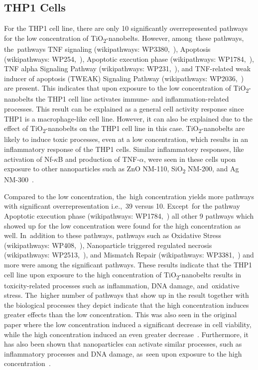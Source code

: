 \documentclass[ijms,article,accept,moreauthors,pdftex]{Definitions/mdpi}
\begin{document}
\begin{paracol}{2}
\subsection{THP1 Cells}
For the THP1 cell line, there are only 10 significantly overrepresented pathways for the low concentration of TiO\textsubscript{2}-nanobelts. However, among~these pathways, the~pathways TNF signaling (wikipathways: WP3380,~\cite{WP3380}), Apoptosis (wikipathways: WP254,~\cite{WP254}), Apoptotic execution phase (wikipathways: WP1784,~\cite{WP1784}), TNF alpha Signaling Pathway (wikipathways: WP231,~\cite{WP231}), and TNF-related weak inducer of apoptosis (TWEAK) Signaling Pathway (wikipathways: WP2036,~\cite{WP2036}) are present. This indicates that upon exposure to the low concentration of TiO\textsubscript{2}-nanobelts the THP1 cell line activates immune- and inflammation-related processes. This result can be explained as a general cell activity response since THP1 is a macrophage-like cell line. However, it can also be explained due to the effect of TiO\textsubscript{2}-nanobelts on the THP1 cell line in this case. TiO\textsubscript{2}-nanobelts are likely to induce toxic processes, even at a low concentration, which results in an inflammatory response of the THP1 cells. Similar inflammatory responses, like activation of Nf-$\kappa$B and production of TNF-$\alpha$, were seen in these cells upon exposure to other nanoparticles such as ZnO NM-110, SiO\textsubscript{2} NM-200, and Ag NM-300~\cite{Brzicova2019}. 

Compared to the low concentration, the~high concentration yields more pathways with significant overrepresentation i.e.,~39 versus 10. Except~for the pathway Apoptotic execution phase (wikipathways: WP1784,~\cite{WP1784}) all other 9 pathways which showed up for the low concentration were found for the high concentration as well. In~addition to these pathways, pathways such as Oxidative Stress (wikipathways: WP408,~\cite{WP408}), Nanoparticle triggered regulated necrosis (wikipathways: WP2513,~\cite{WP2513}), and Mismatch Repair (wikipathways: WP3381,~\cite{WP3381}) %
and more were among the significant pathways. These results indicate that the THP1 cell line upon exposure to the high concentration of TiO\textsubscript{2}-nanobelts results in toxicity-related processes such as inflammation, DNA damage, and~oxidative stress. The~higher number of pathways that show up in the result together with the biological processes they depict indicate that the high concentration induces greater effects than the low concentration. This was also seen in the original paper where the low concentration induced a significant decrease in cell viability, while the high concentration induced an even greater decrease~\cite{Tilton2013}. Furthermore, it has also been shown that nanoparticles can activate similar processes, such as inflammatory processes and DNA damage, as~seen upon exposure to the high concentration~\cite{Brzicova2019,Huang2017}.


\end{paracol}
\end{document}
